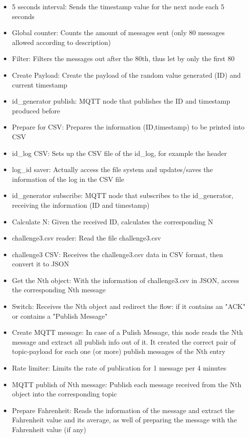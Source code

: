 \documentclass{article}
\begin{document}
\begin{itemize}
    \item 5 seconds interval: Sends the timestamp value for the next node each 5 seconds
    \item Global counter: Counts the amount of messages sent (only 80 messages allowed according to description)
    \item Filter: Filters the messages out after the 80th, thus let by only the first 80
    \item Create Payload: Create the payload of the random value generated (ID) and current timestamp
    \item id\_generator publish: MQTT node that publishes the ID and timestamp produced before
    \item Prepare for CSV: Prepares the information (ID,timestamp) to be printed into CSV
    \item id\_log CSV: Sets up the CSV file of the id\_log, for example the header
    \item log\_id saver: Actually access the file system and updates/saves the information of the log in the CSV file
    \item id\_generator subscribe: MQTT node that subscribes to the id\_generator, receiving the information (ID and timestamp)
    \item Calculate N: Given the received ID, calculates the corresponding N
    \item challenge3.csv reader: Read the file challenge3.csv
    \item challenge3 CSV: Receives the challenge3.csv data in CSV format, then convert it to JSON
    \item Get the Nth object: With the information of challenge3.csv in JSON, access the corresponding Nth message 
    \item Switch: Receives the Nth object and redirect the flow: if it contains an "ACK" or contains a "Publish Message"
    \item Create MQTT message: In case of a Pulish Message, this node reads the Nth message and extract all publish info out of it. It created the correct pair of topic-payload for each one (or more) publish messages of the Nth entry
    \item Rate limiter: Limits the rate of publication for 1 message per 4 minutes
    \item MQTT publish of Nth message: Publish each message received from the Nth object into the corresponding topic
    \item Prepare Fahrenheit: Reads the information of the message and extract the Fahrenheit value and its average, as well of preparing the message with the Fahrenheit value (if any)

\end{itemize}
\end{document}
